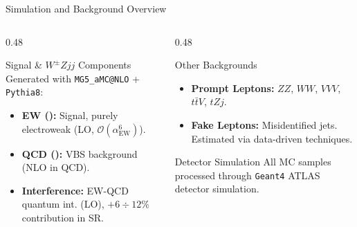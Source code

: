 \begin{frame}{Simulation and Background Overview}
    \begin{columns}[T] %
        
        \begin{column}{0.48\textwidth}
            \begin{block}{Signal \& $W^\pm Zjj$ Components}
                \small
                Generated with \texttt{MG5\_aMC@NLO} + \texttt{Pythia8}:
                \begin{itemize}
                    \item \textbf{EW (\wzjjew):} Signal, purely electroweak (LO, $\mathcal{O}(\alpha_\text{EW}^6)$).
                    \item \textbf{QCD (\wzjjqcd):} VBS background (NLO in QCD).
                    \item \textbf{Interference:} EW-QCD quantum int. (LO), $+6\div12\%$ contribution in SR.
                \end{itemize}
            \end{block}
        \end{column}
        
        \begin{column}{0.48\textwidth}
            \begin{block}{Other Backgrounds}
                \small
                \begin{itemize}
                    \item \textbf{Prompt Leptons:} $ZZ$, $WW$, $VVV$, $t\bar{t}V$, $tZj$.
                    \item \textbf{Fake Leptons:} Misidentified jets. Estimated via data-driven techniques.
                \end{itemize}
            \end{block}
            
            \vspace{0.2cm} %
            
            \begin{block}{Detector Simulation}
                \small
                All MC samples processed through \texttt{Geant4} ATLAS detector simulation.
            \end{block}
        \end{column}
        
    \end{columns}
\end{frame}
    
